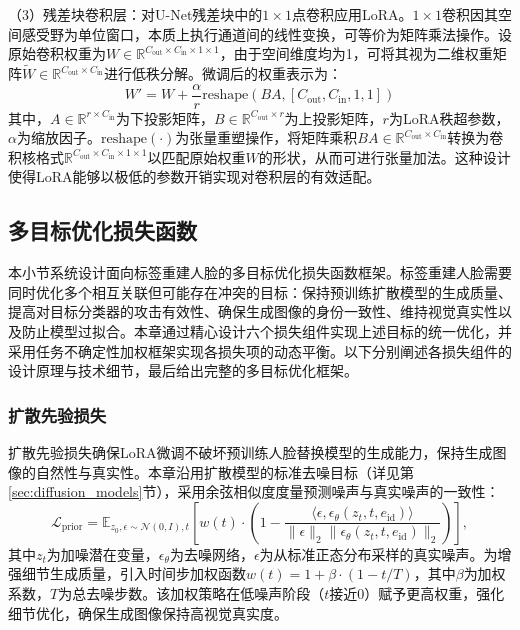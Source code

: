 （3）残差块卷积层：对U-Net残差块中的$1\times1$点卷积应用LoRA。$1\times1$卷积因其空间感受野为单位窗口，本质上执行通道间的线性变换，可等价为矩阵乘法操作。设原始卷积权重为$W\in\mathbb{R}^{C_{\text{out}}\times C_{\text{in}}\times 1\times 1}$，由于空间维度均为1，可将其视为二维权重矩阵$\tilde{W}\in\mathbb{R}^{C_{\text{out}}\times C_{\text{in}}}$进行低秩分解。微调后的权重表示为：
\begin{equation}\label{eq:mia_lora_conv}
    W' = W + \frac{\alpha}{r} \text{reshape}(B A, [C_{\text{out}}, C_{\text{in}}, 1, 1])
\end{equation}
其中，$A\in\mathbb{R}^{r\times C_{\text{in}}}$为下投影矩阵，$B\in\mathbb{R}^{C_{\text{out}}\times r}$为上投影矩阵，$r$为LoRA秩超参数，$\alpha$为缩放因子。$\text{reshape}(\cdot)$为张量重塑操作，将矩阵乘积$BA\in\mathbb{R}^{C_{\text{out}}\times C_{\text{in}}}$转换为卷积核格式$\mathbb{R}^{C_{\text{out}}\times C_{\text{in}}\times 1\times 1}$以匹配原始权重$W$的形状，从而可进行张量加法。这种设计使得LoRA能够以极低的参数开销实现对卷积层的有效适配。

\subsection{多目标优化损失函数}
\label{sec:mia_loss}

本小节系统设计面向标签重建人脸的多目标优化损失函数框架。标签重建人脸需要同时优化多个相互关联但可能存在冲突的目标：保持预训练扩散模型的生成质量、提高对目标分类器的攻击有效性、确保生成图像的身份一致性、维持视觉真实性以及防止模型过拟合。本章通过精心设计六个损失组件实现上述目标的统一优化，并采用任务不确定性加权框架实现各损失项的动态平衡。以下分别阐述各损失组件的设计原理与技术细节，最后给出完整的多目标优化框架。

\subsubsection{扩散先验损失}

扩散先验损失确保LoRA微调不破坏预训练人脸替换模型的生成能力，保持生成图像的自然性与真实性。本章沿用扩散模型的标准去噪目标（详见第\ref{sec:diffusion_models}节），采用余弦相似度度量预测噪声与真实噪声的一致性：
\begin{equation}\label{eq:mia_prior_loss}
    \mathcal{L}_{\text{prior}} = \mathbb{E}_{z_0, \epsilon\sim\mathcal{N}(0,I), t} \left[ w(t) \cdot \left(1 - \frac{\langle \epsilon, \epsilon_\theta(z_t, t, e_{\text{id}}) \rangle}{\|\epsilon\|_2 \|\epsilon_\theta(z_t, t, e_{\text{id}})\|_2} \right) \right],
\end{equation}
其中$z_t$为加噪潜在变量，$\epsilon_\theta$为去噪网络，$\epsilon$为从标准正态分布采样的真实噪声。为增强细节生成质量，引入时间步加权函数$w(t) = 1 + \beta \cdot (1 - t/T)$，其中$\beta$为加权系数，$T$为总去噪步数。该加权策略在低噪声阶段（$t$接近0）赋予更高权重，强化细节优化，确保生成图像保持高视觉真实度。

